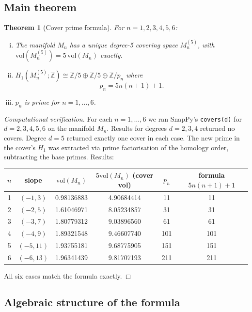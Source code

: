 \documentclass[11pt,a4paper]{article}
\newtheorem{theorem}{Theorem}
\theoremstyle{definition}
\newcommand{\ZZ}{\mathbb{Z}}
\newcommand{\Zfive}{\ZZ/5}
\newcommand{\vol}{\mathrm{vol}}
\newcommand{\Mn}{M_n}
\begin{document}
\subsection{Main theorem}

\begin{theorem}[Cover prime formula]
\label{thm:cover}
For $n = 1, 2, 3, 4, 5, 6$:
\begin{enumerate}[(i)]
\item The manifold $\Mn$ has a unique degree-5 covering space
  $\Mn^{(5)}$, with $\vol(\Mn^{(5)}) = 5\,\vol(\Mn)$ exactly.
\item $H_1(\Mn^{(5)};\ZZ) \cong \Zfive \oplus \Zfive \oplus \ZZ/p_n$
  where
  \[
    p_n = 5n(n+1)+1.
  \]
\item $p_n$ is prime for $n = 1,\ldots,6$.
\end{enumerate}
\end{theorem}

\begin{proof}[Computational verification]
For each $n=1,\ldots,6$ we ran SnapPy's \texttt{covers(d)} for
$d=2,3,4,5,6$ on the manifold $\Mn$.
Results for degrees $d=2,3,4$ returned no covers.
Degree $d=5$ returned exactly one cover in each case.
The new prime in the cover's $H_1$ was extracted via prime
factorisation of the homology order, subtracting the base primes.
Results:

\begin{center}
\begin{tabular}{cccccc}
\toprule
$n$ & slope & $\vol(\Mn)$ &
  $5\vol(\Mn)$ (cover vol) & $p_n$ & formula $5n(n+1)+1$ \\
\midrule
1 & $(-1,3)$  & 0.98136883 & 4.90684414 &  11 &  11 \\
2 & $(-2,5)$  & 1.61046971 & 8.05234857 &  31 &  31 \\
3 & $(-3,7)$  & 1.80779312 & 9.03896560 &  61 &  61 \\
4 & $(-4,9)$  & 1.89321548 & 9.46607740 & 101 & 101 \\
5 & $(-5,11)$ & 1.93755181 & 9.68775905 & 151 & 151 \\
6 & $(-6,13)$ & 1.96341439 & 9.81707193 & 211 & 211 \\
\bottomrule
\end{tabular}
\end{center}

All six cases match the formula exactly.
\end{proof}

\subsection{Algebraic structure of the formula}
\end{document}
